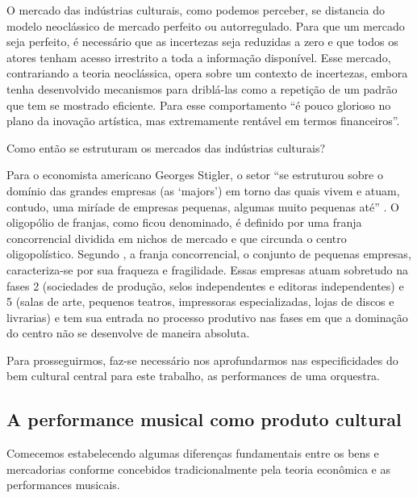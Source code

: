 \documentclass[a4paper, 12pt, openright, oneside, german, french, english, brazil]{abntex2}
\begin{document}
	O mercado das indústrias culturais, como podemos perceber, se distancia do modelo neoclássico de mercado perfeito ou autorregulado. Para que um mercado seja perfeito, é necessário que as incertezas seja reduzidas a zero e que todos os atores tenham acesso irrestrito a toda a informação disponível. Esse mercado, contrariando a teoria neoclássica, opera sobre um contexto de incertezas, embora tenha desenvolvido mecanismos para driblá-las como a repetição de um padrão que tem se mostrado eficiente. Para  esse comportamento ``é pouco glorioso no plano da inovação artística, mas extremamente rentável em termos financeiros''. 
	
	Como então se estruturam os mercados das indústrias culturais?
	
	Para o economista americano Georges Stigler, o setor ``se estruturou sobre o domínio das grandes empresas (as `majors') em torno das quais vivem e atuam, contudo, uma miríade de empresas pequenas, algumas muito pequenas até'' \cite[p. 43]{tolila2007cultura}. O oligopólio de franjas, como ficou denominado, é definido por uma franja concorrencial dividida em nichos de mercado e que circunda o centro oligopolístico. Segundo , a franja concorrencial, o conjunto de pequenas empresas, caracteriza-se por sua fraqueza e fragilidade. Essas empresas atuam sobretudo na fases 2 (sociedades de produção, selos independentes e editoras independentes) e 5 (salas de arte, pequenos teatros, impressoras especializadas, lojas de discos e livrarias) e tem sua entrada no processo produtivo nas fases em que a dominação do centro não se desenvolve de maneira absoluta. 
	
	Para prosseguirmos, faz-se necessário nos aprofundarmos nas especificidades do bem cultural central para este trabalho, as performances de uma orquestra.
	
	
	\subsection{A performance musical como produto cultural}
	
	Comecemos estabelecendo algumas diferenças fundamentais entre os bens e mercadorias conforme concebidos tradicionalmente pela teoria econômica e as performances musicais.
	
\end{document}
